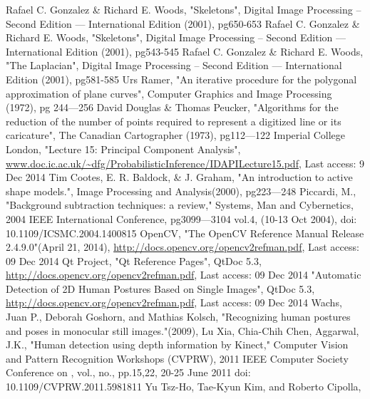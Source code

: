 \documentclass[a4paper, 12pt]{article}
\begin{document}
%
%
\clearpage
\begin{thebibliography}{9}
    Rafael C. Gonzalez \& Richard E. Woods,
    "Skeletons",
    Digital Image Processing -- Second Edition --- International Edition (2001),
    pg650-653
%
    Rafael C. Gonzalez \& Richard E. Woods,
    "Skeletons",
    Digital Image Processing -- Second Edition --- International Edition (2001),
    pg543-545
%
    Rafael C. Gonzalez \& Richard E. Woods,
    "The Laplacian",
    Digital Image Processing -- Second Edition --- International Edition (2001),
    pg581-585
%
    Urs Ramer,
    "An iterative procedure for the polygonal approximation of plane curves",
    Computer Graphics and Image Processing (1972),
    pg 244--–256
%
	David Douglas \& Thomas Peucker,
	"Algorithms for the reduction of the number of points required to represent a 				digitized line or its caricature",
	The Canadian Cartographer (1973),
	pg112--–122
%
	Imperial College London,
	"Lecture 15: Principal Component Analysis",
	\url{www.doc.ic.ac.uk/~dfg/ProbabilisticInference/IDAPILecture15.pdf},
	Last access: 9 Dec 2014
%
	Tim Cootes, E. R. Baldock, \& J. Graham,
 	"An introduction to active shape models.",
 	Image Processing and Analysis(2000),
 	pg223---248
%
	Piccardi, M., "Background subtraction techniques: a review," Systems,
	Man and Cybernetics,
	2004 IEEE International Conference,
	pg3099---3104 vol.4, 		
	(10-13 Oct 2004),
	doi: 10.1109/ICSMC.2004.1400815
%
	OpenCV,
	"The OpenCV Reference Manual
	Release 2.4.9.0"(April 21, 2014),
	\url{http://docs.opencv.org/opencv2refman.pdf},
	Last access: 09 Dec 2014
%
	Qt Project,
	"Qt Reference Pages",
	QtDoc 5.3,
	\url{http://docs.opencv.org/opencv2refman.pdf},
	Last access: 09 Dec 2014
%
	"Automatic Detection of 2D Human Postures Based
on Single Images",
	QtDoc 5.3,
	\url{http://docs.opencv.org/opencv2refman.pdf},
	Last access: 09 Dec 2014
%
	Wachs, Juan P., Deborah Goshorn, and Mathias Kolsch,
	"Recognizing human postures and poses in monocular still images."(2009),
%
	Lu Xia, Chia-Chih Chen, Aggarwal, J.K.,
	"Human detection using depth information by Kinect,"
	Computer Vision and Pattern Recognition Workshops (CVPRW),
	2011 IEEE Computer Society Conference on , vol.,
	no., pp.15,22, 20-25 June 2011
doi: 10.1109/CVPRW.2011.5981811
%
	Yu Tsz-Ho, Tae-Kyun Kim, and Roberto Cipolla,

\end{thebibliography}
\end{document}
